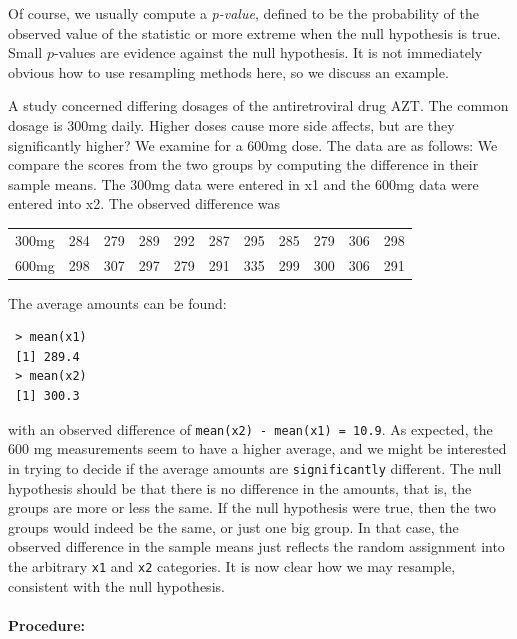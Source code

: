 \documentclass[captions=tableheading]{scrbook}
\begin{document}
Of course, we usually compute a \emph{p-value}, defined to be the probability of the observed value of the statistic or more extreme when the null hypothesis is true. Small \(p\)-values are evidence against the null hypothesis. It is not immediately obvious how to use resampling methods here, so we discuss an example.

\begin{example}
A study concerned differing dosages of the antiretroviral drug AZT. The common dosage is 300mg daily. Higher doses cause more side affects, but are they significantly higher? We examine for a 600mg dose. The data are as follows: We compare the scores from the two groups by computing the difference in their sample means. The 300mg data were entered in x1 and the 600mg data were entered into x2. The observed difference was


\begin{center}
\begin{tabular}{lrrrrrrrrrr}
 300mg  &  284  &  279  &  289  &  292  &  287  &  295  &  285  &  279  &  306  &  298  \\
 600mg  &  298  &  307  &  297  &  279  &  291  &  335  &  299  &  300  &  306  &  291  \\
\end{tabular}
\end{center}



The average amounts can be found:
\begin{verbatim}
 > mean(x1)
 [1] 289.4
 > mean(x2)
 [1] 300.3
\end{verbatim}

with an observed difference of \texttt{mean(x2) - mean(x1) = 10.9}. As expected, the 600 mg measurements seem to have a higher average, and we might be interested in trying to decide if the average amounts are \texttt{significantly} different. The null hypothesis should be that there is no difference in the amounts, that is, the groups are more or less the same. If the null hypothesis were true, then the two groups would indeed be the same, or just one big group. In that case, the observed difference in the sample means just reflects the random assignment into the arbitrary \texttt{x1} and \texttt{x2} categories. It is now clear how we may resample, consistent with the null hypothesis.

\paragraph*{Procedure:}


\end{example}
\end{document}
